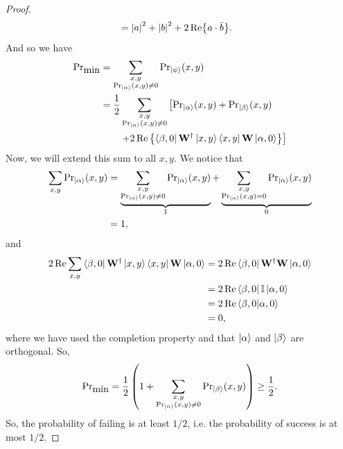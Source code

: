 \documentclass{book}
\theoremstyle{definition}
\newcommand{\nn}{\nonumber}
\newcommand{\al}{\alpha}
\newcommand{\be}{\beta}
\newcommand{\f}[2]{\frac{#1}{#2}}
\newcommand{\lp}{\left(}
\newcommand{\rp}{\right)}
\newcommand{\lb}{\left[}
\newcommand{\rb}{\right]}
\newcommand{\lc}{\left\{}
\newcommand{\rc}{\right\}}
\newcommand{\Id}{\mathbb{I}}
\begin{document}
\begin{enumerate}[(a)]
\begin{proof}
\begin{align}
		& = \abs{a}^2 + \abs{b}^2 + 2\Re{a\cdot \bar{b}}.
		\end{align}
		And so we have
		\begin{align}
		{\Pr}_{\mbox{min}} &= \sum\limits_{\substack{x,y\\{\Pr}_{\ket{\al}} (x,y) \neq 0}} {\Pr}_{\ket{\psi}} (x,y)\nn\\
		&= \f{1}{2}\sum\limits_{\substack{x,y\\{\Pr}_{\ket{\al}} (x,y) \neq 0}}\lb  {\Pr}_{\ket{\al}}(x,y) + {\Pr}_{\ket{\be}}(x,y)\right.\nn\\
		&\qquad\left. + 2\Re\lc \bra{\be,0}\mathbf{W}^\dagger\ket{x,y}\bra{x,y}\mathbf{W}\ket{\al,0}  \rc   \rb
		\end{align}
		Now, we will extend this sum to all $x,y$. We notice that
		\begin{align}
		\sum_{x,y}{\Pr}_{\ket{\al}}(x,y) &= \underbrace{\sum\limits_{\substack{x,y\\{\Pr}_{\ket{\al}} (x,y) \neq 0}} {\Pr}_{\ket{\al}}(x,y)}_{1} + \underbrace{\sum\limits_{\substack{x,y\\{\Pr}_{\ket{\al}} (x,y) = 0}} {\Pr}_{\ket{\al}}(x,y)}_{0}\nn\\
		&=1,
		\end{align}
		and 
		\begin{align}
		2\Re \sum_{x,y}  \bra{\be,0}\mathbf{W}^\dagger\ket{x,y}\bra{x,y}\mathbf{W}\ket{\al,0}   &=  2\Re \bra{\be,0} \mathbf{W}^\dagger\mathbf{W}\ket{\al,0}\nn\\
		&= 2\Re\bra{\be,0}\Id\ket{\al,0}\nn\\
		&= 2\Re\braket{\be,0}{\al,0}\nn\\
		&= 0,
		\end{align}
		where we have used the completion property and that $\ket{\al}$ and $\ket{\be}$ are orthogonal. So,
		\begin{align}
		{\Pr}_{\mbox{min}} = \f{1}{2}\lp 1 +  \sum\limits_{\substack{x,y\\{\Pr}_{\ket{\al}} (x,y) \neq 0}} {\Pr}_{\ket{\be}}(x,y) \rp \geq \f{1}{2}. 
		\end{align}
		So, the probability of failing is at least $1/2$, i.e. the probability of success is at most $1/2$. 
		
		
	\end{proof} 
	
	
	
	
	
	
	
	
\end{enumerate}
\end{document}
